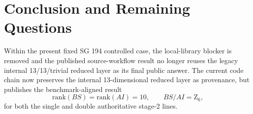 \documentclass[11pt]{article}
\begin{document}
\section{Conclusion and Remaining Questions}
Within the present fixed SG 194 controlled case, the local-library blocker is removed and the published source-workflow result no longer reuses the legacy internal 13/13/trivial reduced layer as its final public answer. The current code chain now preserves the internal 13-dimensional reduced layer as provenance, but publishes the benchmark-aligned result
\[
\mathrm{rank}(BS) = \mathrm{rank}(AI) = 10,
\qquad
BS/AI = \mathrm{Z}_{6},
\]
for both the single and double authoritative stage-2 lines.
\end{document}
